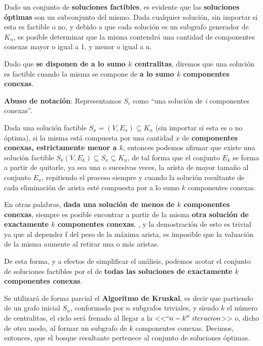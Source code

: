 \documentclass[11pt, a4paper, twoside]{article}
\begin{document}

Dado un conjunto de \textbf{soluciones factibles}, es evidente que las \textbf{soluciones óptimas}
son un subconjunto del mismo. Dada cualquier solución, sin importar si esta es factible o no, y
debido a que cada solución es un subgrafo generador de $K_{n}$, es posible determinar que la misma
contendrá una cantidad de componentes conexas mayor o igual a 1, y menor o igual a n.

Dado que \textbf{se disponen de a lo sumo $k$ centralitas}, diremos que una solución es factible
cuando la misma se compone de \textbf{a lo sumo $k$ componentes conexas}.

\textbf{Abuso de notación}: Representamos $S_{i}$ como ``una solución de \emph{i} componentes conexas''.

Dada una solución factible $S_{x} = (V, E_{x}) \subseteq K_{n}$ (sin importar si esta es o no
óptima), si la misma está compuesta por una cantidad $x$ de \textbf{componentes conexas,
estrictamente menor a $k$}, entonces podemos afirmar que existe una solución factible $S_{k} (V,
E_{k}) \subseteq S_{x} \subseteq K_{n}$, de tal forma que el conjunto $E_{k}$ se forma a partir de
quitarle, ya sea una o sucesivas veces, la arista de mayor tamaño al conjunto $E_{x}$, repitiendo el
proceso siempre y cuando la solución resultante de cada eliminación de arista esté compuesta por a
lo sumo $k$ componentes conexas.

En otras palabras, \textbf{dada una solución de menos de $k$ componentes conexas}, siempre es
posible encontrar a partir de la misma \textbf{otra solución de exactamente $k$ componentes
conexas}. , y la demostración de esto
es trivial ya que al depender f del peso de la máxima arista, es imposible que la valuación de la
misma aumente al retirar una o más aristas.

De esta forma, y a efectos de simplificar el análisis, podemos acotar el conjunto de soluciones
factibles por el de \textbf{todas las soluciones de exactamente $k$ componentes conexas}.



Se utilizará de forma parcial el \textbf{Algoritmo de Kruskal}, es decir que partiendo de un grafo
inicial $S_{n}$, conformado por $n$ subgrafos triviales, y siendo $k$ el número de centralitas, el
ciclo será frenado al llegar a la <<$``n-k''~iteracion$>> o, dicho de otro modo, al formar un
subgrafo de $k$ componentes conexas. Decimos, entonces, que el bosque resultante pertenece al
conjunto de soluciones óptimas.
\end{document}

